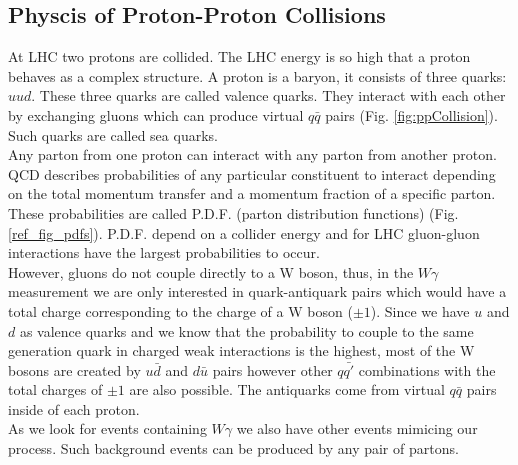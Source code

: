 \subsection{Physcis of Proton-Proton Collisions}

At LHC two protons are collided. The LHC energy is so high that a proton behaves as a complex structure. A proton is a baryon, it consists of three quarks: $uud$. These three quarks are called valence quarks. They interact with each other by exchanging gluons which can produce virtual $q\bar{q}$ pairs (Fig. \ref{fig:ppCollision}). Such quarks are called sea quarks. \\

Any parton from one proton can interact with any parton from another proton. QCD describes probabilities of any particular constituent to interact depending on the total momentum transfer and a momentum fraction of a specific parton. These probabilities are called P.D.F. (parton distribution functions) (Fig. \ref{ref_fig_pdfs}). P.D.F. depend on a collider energy and for LHC gluon-gluon interactions have the largest probabilities to occur.\\

However, gluons do not couple directly to a W boson, thus, in the $W\gamma$ measurement we are only interested in quark-antiquark pairs which would have a total charge corresponding to the charge of a W boson ($\pm 1$). Since we have $u$ and $d$ as valence quarks and we know that the probability to couple to the same generation quark in charged weak interactions is the highest, most of the W bosons are created by $u\bar{d}$ and $d\bar{u}$ pairs however other $q\bar{q'}$ combinations with the total charges of $\pm 1$ are also possible. The antiquarks come from virtual $q\bar{q}$ pairs inside of each proton.\\

As we look for events containing $W\gamma$ we also have other events mimicing our process. Such background events can be produced by any pair of partons.\\


